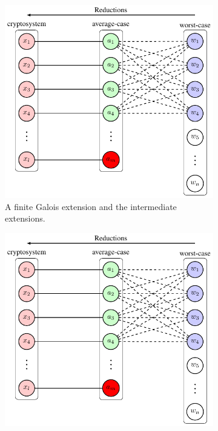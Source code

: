 \documentclass[../main.tex]{subfiles}
\begin{document}

\begin{figure}[!ht]
	\centering
	\begin{subfigure}[t]{0.48\textwidth}
		\centering
		\includegraphics[page=12]{images/Lattice_crypto_tikz_folder.pdf}
		\caption{A finite Galois extension and the intermediate extensions.}
		\label{subfig:finite galois ext 2}
	\end{subfigure}\quad
	\begin{subfigure}[t]{0.48\textwidth}
		\centering
		\includegraphics[page=13]{images/Lattice_crypto_tikz_folder.pdf}

\end{subfigure}
\end{figure}
\end{document}
